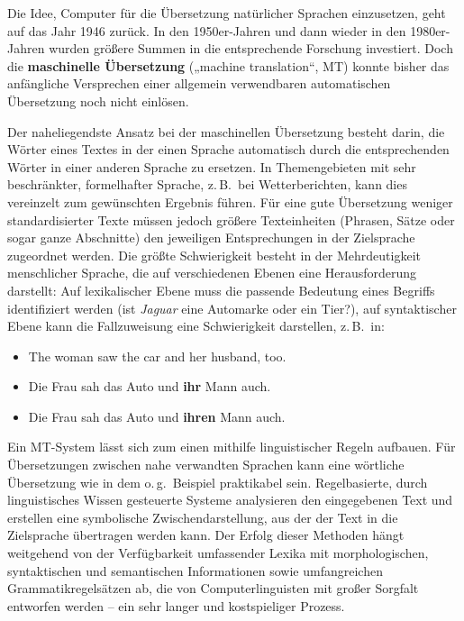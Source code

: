\begin{multicols}{2}
Die Idee, Computer für die Übersetzung natürlicher Sprachen einzusetzen, geht auf das Jahr 1946 zurück. In den 1950er-Jahren und dann wieder in den 1980er-Jahren wurden größere Summen in die entsprechende Forschung investiert. Doch die \textbf{maschinelle Übersetzung} („machine translation“, MT) konnte bisher das anfängliche Versprechen einer allgemein verwendbaren automatischen Übersetzung noch nicht einlösen.


Der naheliegendste Ansatz bei der maschinellen Übersetzung besteht darin, die Wörter eines Textes in der einen Sprache automatisch durch die entsprechenden Wörter in einer anderen Sprache zu ersetzen. In Themengebieten mit sehr beschränkter, formelhafter Sprache, z.\,B.~bei Wetterberichten, kann dies vereinzelt zum gewünschten Ergebnis führen. Für eine gute Übersetzung weniger standardisierter Texte müssen jedoch größere Texteinheiten (Phrasen, Sätze oder sogar ganze Abschnitte) den jeweiligen Entsprechungen in der Zielsprache zugeordnet werden. Die größte Schwierigkeit besteht in der Mehrdeutigkeit menschlicher Sprache, die auf verschiedenen Ebenen eine Herausforderung darstellt: Auf lexikalischer Ebene muss die passende Bedeutung eines Begriffs identifiziert werden (ist \textit{Jaguar} eine Automarke oder ein Tier?), auf syntaktischer Ebene kann die Fallzuweisung eine Schwierigkeit darstellen, z.\,B.~in:

\begin{itemize}
\item[] The woman saw the car and her husband, too.
\item Die Frau sah das Auto und \textbf{ihr} Mann auch. 
\item Die Frau sah das Auto und \textbf{ihren} Mann auch.
\end{itemize}

Ein MT-System lässt sich zum einen mithilfe linguistischer Regeln aufbauen. Für Übersetzungen zwischen nahe verwandten Sprachen kann eine wörtliche Übersetzung wie in dem o.\,g.~Beispiel praktikabel sein. Regelbasierte, durch linguistisches Wissen gesteuerte Systeme analysieren den eingegebenen Text und erstellen eine symbolische Zwischendarstellung, aus der der Text in die Zielsprache übertragen werden kann. Der Erfolg dieser Methoden hängt weitgehend von der Verfügbarkeit umfassender Lexika mit morphologischen, syntaktischen und semantischen Informationen sowie umfangreichen Grammatikregelsätzen ab, die von Computerlinguisten mit großer Sorgfalt entworfen werden -- ein sehr langer und kostspieliger Prozess.


\end{multicols}

